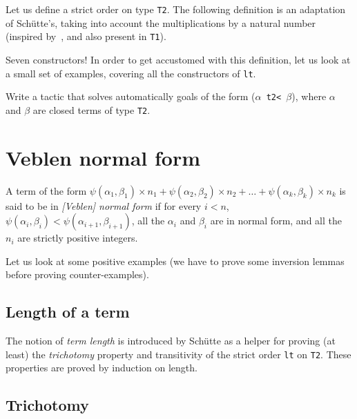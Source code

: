 Let us define a strict order on type \texttt{T2}. The following definition is 
an adaptation of Schütte's, taking into account the multiplications by a natural number (inspired by~\cite{Manolios2005}, and also present in \texttt{T1}).

\label{sect:t2-lt-def}




Seven constructors! In order to get accustomed with this definition, let us look at a small set of examples, covering all the constructors of \texttt{lt}.





\begin{project}
Write a tactic that solves automatically goals of the form (\texttt{$\alpha$ t2< $\beta$}), where $\alpha$ and $\beta$ are closed terms of type \texttt{T2}.
\end{project}

\section{Veblen normal form}
\begin{definition}
  A term of the form $\psi(\alpha_1,\beta_1)\times n_1+ \psi(\alpha_2,\beta_2)\times n_2+\dots+\psi(\alpha_k,\beta_k)\times n_k$ is said to be in
 \emph{[Veblen] normal form} if for every $i<n$, $\psi(\alpha_i,\beta_i)<\psi(\alpha_{i+1},\beta_{i+1})$, all the $\alpha_i$ and $\beta_i$ are in normal form, and all the $n_i$ are strictly positive integers.
\end{definition}





Let us look at some positive examples (we have to prove some inversion lemmas before proving counter-examples).




\subsection{Length of a term}

The notion of \emph{term length} is introduced by Schütte as a helper for proving (at least) the \emph{trichotomy} property and transitivity of the strict order \texttt{lt} on \texttt{T2}. These properties are proved by induction on length.


\subsection{Trichotomy}

